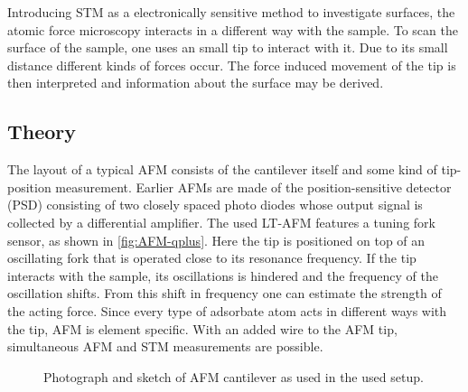 Introducing STM as a electronically sensitive method to investigate surfaces, the atomic force microscopy interacts in a different way with the sample.
To scan the surface of the sample, one uses an small tip to interact with it. Due to its small distance different kinds of forces occur. The force induced movement of the tip is then interpreted and information about the surface may be derived.
\subsection{Theory}
The layout of a typical  AFM consists of the cantilever itself and some kind of tip-position measurement. Earlier AFMs are made of the position-sensitive detector (PSD) consisting of two closely spaced photo diodes whose output signal is collected by a differential amplifier. The used LT-AFM features a tuning fork sensor, as shown in \autoref{fig:AFM-qplus}. Here the tip is positioned on top of an oscillating fork that is operated close to its resonance frequency. If the tip interacts with the sample, its oscillations is hindered and the frequency of the oscillation shifts. From this shift in frequency one can estimate the strength of the acting force. Since every type of adsorbate atom acts in different ways with the tip, AFM is element specific. With an added wire to the AFM tip, simultaneous AFM and STM measurements are possible. 

\begin{figure}\centering
	
	\caption{Photograph  and sketch  of AFM cantilever as used in the used setup. }
	\label{fig:AFM-tuning-fork}
\end{figure}	


